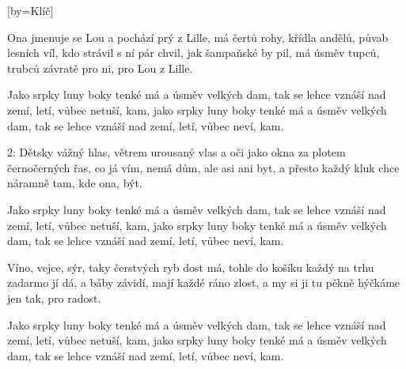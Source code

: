 [by={Klíč}]

\beginverse{}
Ona jmenuje se Lou a pochází prý z Lille,
má čertů rohy, křídla andělů, půvab lesních víl,
kdo strávil s ní pár chvil, jak šampaňské by pil,
má úsměv tupců, trubců závratě pro ni, pro Lou z Lille.
\endverse{}

\beginchorus{}
Jako srpky luny boky tenké má a úsměv velkých dam,
tak se lehce vznáší nad zemí, letí, vůbec netuší, kam,
jako srpky luny boky tenké má a úsměv velkých dam,
tak se lehce vznáší nad zemí, letí, vůbec neví, kam.
\endchorus{}

\beginverse{}
2: Dětsky vážný hlas, větrem urousaný vlas
a oči jako okna za plotem černočerných řas,
co já vím, nemá dům, ale asi ani byt,
a přesto každý kluk chce náramně tam, kde ona, být.
\endverse{}

\beginchorus{}
Jako srpky luny boky tenké má a úsměv velkých dam,
tak se lehce vznáší nad zemí, letí, vůbec netuší, kam,
jako srpky luny boky tenké má a úsměv velkých dam,
tak se lehce vznáší nad zemí, letí, vůbec neví, kam.
\endchorus{}

\beginverse{}
Víno, vejce, sýr, taky čerstvých ryb dost má,
tohle do košíku každý na trhu zadarmo jí dá,
a báby závidí, mají každé ráno zlost,
a my si ji tu pěkně hýčkáme jen tak, pro radost.
\endverse{}

\repeatingchorus{}
\beginchorus{}
Jako srpky luny boky tenké má a úsměv velkých dam,
tak se lehce vznáší nad zemí, letí, vůbec netuší, kam,
jako srpky luny boky tenké má a úsměv velkých dam,
tak se lehce vznáší nad zemí, letí, vůbec neví, kam.
\endchorus{}

